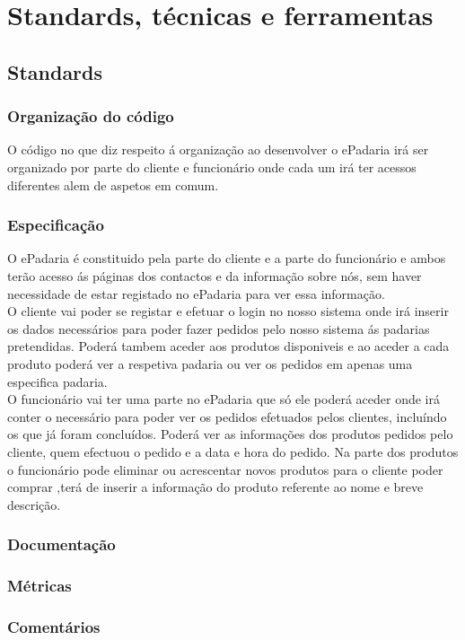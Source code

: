 \chapter{Standards, técnicas e ferramentas}
\label{standards_tecnicas_ferramentas}

\section{Standards}
\subsection{Organização do código}
O código no que diz respeito á organização ao desenvolver o ePadaria irá ser organizado por parte do cliente e funcionário onde cada um irá ter acessos diferentes alem de aspetos em comum.
\subsection{Especificação}
O ePadaria é constituido pela parte do cliente e a parte do funcionário e ambos terão acesso ás páginas dos contactos e da informação sobre nós, sem haver necessidade de estar registado no ePadaria para ver essa informação.\\
O cliente vai poder se registar e efetuar o login no nosso sistema onde irá inserir os dados necessários para poder fazer pedidos pelo nosso sistema ás padarias pretendidas. Poderá tambem aceder aos produtos disponiveis e ao aceder a cada produto poderá ver a respetiva padaria ou ver os pedidos em apenas uma especifica padaria. \\
O funcionário vai ter uma parte no ePadaria que só ele poderá aceder onde irá conter o necessário para poder ver os pedidos efetuados pelos clientes, incluíndo os que já foram concluídos. Poderá ver as informações dos produtos pedidos pelo cliente, quem efectuou o pedido e a data e hora do pedido. Na parte dos produtos o funcionário pode eliminar ou acrescentar novos produtos para o cliente poder comprar ,terá de inserir a informação do produto referente ao nome e breve descrição.

\subsection{Documentação}
\subsection{Métricas}
\subsection{Comentários}

